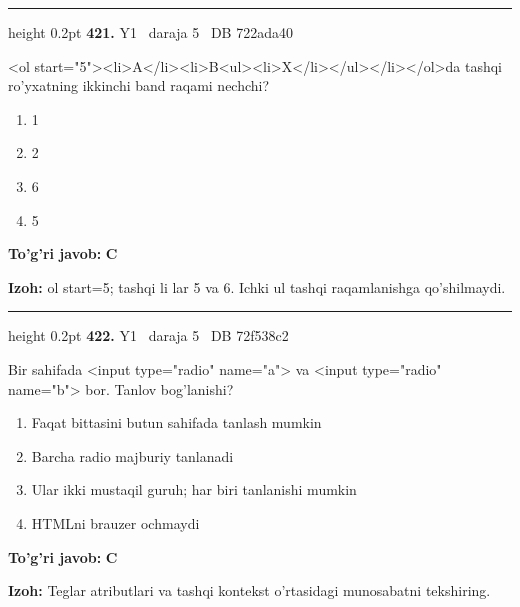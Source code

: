 \documentclass[10pt,a4paper,oneside]{article}
\begin{document}
\vspace{2mm}\hrule height 0.2pt \vspace{4mm}
\hypertarget{q421}{\textbf{\color{ink}421.}}  {\color{muted}\scriptsize Y1 \textbullet\ daraja 5 \textbullet\ DB 722ada40}
\par
\textless{}ol start="5"\textgreater{}\textless{}li\textgreater{}A\textless{}/li\textgreater{}\textless{}li\textgreater{}B\textless{}ul\textgreater{}\textless{}li\textgreater{}X\textless{}/li\textgreater{}\textless{}/ul\textgreater{}\textless{}/li\textgreater{}\textless{}/ol\textgreater{}da tashqi ro'yxatning ikkinchi band raqami nechchi?
\begin{enumerate}[label=\Alph*),leftmargin=9mm]
\item 1
\item 2
\item 6
\item 5
\end{enumerate}
\begin{tcolorbox}[enhanced,breakable,colback=teal!4,colframe=teal!45!black,boxrule=0.45pt,arc=1.2mm,left=2.8mm,right=2.8mm,top=2mm,bottom=2mm,before skip=2mm,after skip=2mm]
\textbf{\color{teal}To'g'ri javob:} \textbf{C}
\par\smallskip
\textbf{Izoh:} ol start=5; tashqi li lar 5 va 6. Ichki ul tashqi raqamlanishga qo'shilmaydi.
\end{tcolorbox}
\vspace{2mm}\hrule height 0.2pt \vspace{4mm}
\hypertarget{q422}{\textbf{\color{ink}422.}}  {\color{muted}\scriptsize Y1 \textbullet\ daraja 5 \textbullet\ DB 72f538c2}
\par
Bir sahifada \textless{}input type="radio" name="a"\textgreater{} va \textless{}input type="radio" name="b"\textgreater{} bor. Tanlov bog'lanishi?
\begin{enumerate}[label=\Alph*),leftmargin=9mm]
\item Faqat bittasini butun sahifada tanlash mumkin
\item Barcha radio majburiy tanlanadi
\item Ular ikki mustaqil guruh; har biri tanlanishi mumkin
\item HTMLni brauzer ochmaydi
\end{enumerate}
\begin{tcolorbox}[enhanced,breakable,colback=teal!4,colframe=teal!45!black,boxrule=0.45pt,arc=1.2mm,left=2.8mm,right=2.8mm,top=2mm,bottom=2mm,before skip=2mm,after skip=2mm]
\textbf{\color{teal}To'g'ri javob:} \textbf{C}
\par\smallskip
\textbf{Izoh:} Teglar atributlari va tashqi kontekst o'rtasidagi munosabatni tekshiring.
\end{tcolorbox}
\end{document}
